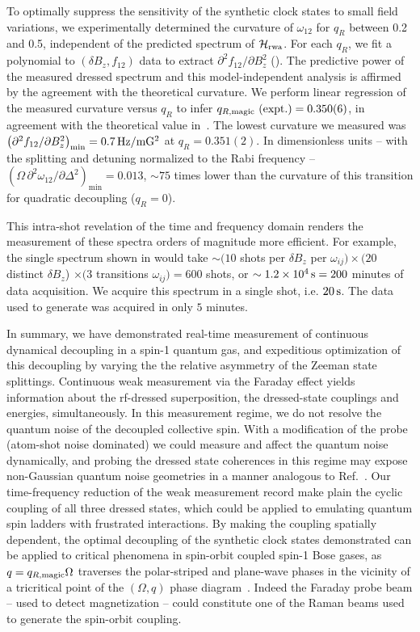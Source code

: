 \documentclass[aps,prl,reprint,superscriptaddress,floatfix]{revtex4-1}
\begin{document}
To optimally suppress the sensitivity of the synthetic clock states to small field variations, we experimentally determined the curvature of $\omega_{12}$  for $q_R$ between 0.2 and 0.5, independent of the predicted spectrum of $\mathcal{H}_{\text{rwa}}$.
For each $q_R$, we fit a polynomial to $(\delta B_z, f_{12})$ data to extract $\partial^2 f_{12}/\partial B_z^2$ ().
The predictive power of the measured dressed spectrum and this model-independent analysis is affirmed by the agreement with the theoretical curvature.
We perform linear regression of the measured curvature versus $q_R$ to infer $q_{R,\text{magic}}\text{ (expt.)} = 0.350(6)$, in agreement with the theoretical value in~.
The lowest curvature we measured was $\left(\partial^2 f_{12}/\partial B_z^2\right)_{\text{min}} = \unit[0.7]{Hz/mG^2}$ at $q_R = 0.351(2)$.
In dimensionless units -- with the splitting and detuning normalized to the Rabi frequency -- $\left(\Omega\, \partial^2\omega_{12}/\partial \Delta^2\right)_{\text{min}} = 0.013$, $\sim 75$ times lower than the curvature of this transition for quadratic decoupling ($q_R = 0$).

This intra-shot revelation of the time and frequency domain renders the measurement of these spectra orders of magnitude more efficient.
For example, the single spectrum shown in  would take $\sim (10$ shots per $\delta B_z$ per $\omega_{ij} ) \times (20$ distinct $\delta B_z$) $\times (3 $ transitions $\omega_{ij}) = 600$ shots, or $\sim \unit[1.2\times10^4]{s} = 200$ minutes of data acquisition.
We acquire this spectrum in a single shot, i.e. $\unit[20]{s}$.
The data used to generate  was acquired in only $5$ minutes.

In summary, we have demonstrated real-time measurement of continuous dynamical decoupling in a spin-1 quantum gas, and expeditious optimization of this decoupling by varying the the relative asymmetry of the Zeeman state splittings.
Continuous weak measurement via the Faraday effect yields information about the rf-dressed superposition, the dressed-state couplings and energies, simultaneously.
In this measurement regime, we do not resolve the quantum noise of the decoupled collective spin.
With a modification of the probe (atom-shot noise dominated) we could measure and affect the quantum noise dynamically,
and probing the dressed state coherences in this regime may expose non-Gaussian quantum noise geometries in a manner analogous to Ref.~\cite{colangelo_simultaneous_2017}.
Our time-frequency reduction of the weak measurement record make plain the cyclic coupling of all three dressed states, which could be applied to emulating quantum spin ladders with frustrated interactions.
By making the coupling spatially dependent, the optimal decoupling of the synthetic clock states demonstrated can be applied to critical phenomena in spin-orbit coupled spin-1 Bose gases, as $q = q_{R,\text{magic}} \Omega$ traverses the polar-striped and plane-wave phases in the vicinity of a tricritical point of the $(\Omega, q)$ phase diagram~\cite{martone_tricriticalities_2016}.
Indeed the Faraday probe beam -- used to detect magnetization -- could constitute one of the Raman beams used to generate the spin-orbit coupling.


\end{document}
